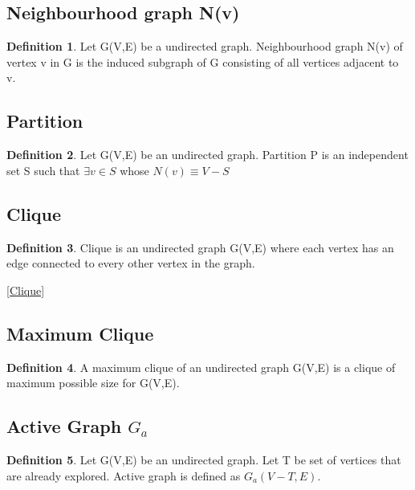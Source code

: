 \documentclass[12pt]{article}
\theoremstyle{plain}
\theoremstyle{definition}
\newtheorem{definition}{Definition}[section]
\begin{document}
\subsection{Neighbourhood graph N(v)}
\begin{definition} \label{NeighbourhoodGraph}
	Let G(V,E) be a undirected graph. Neighbourhood graph N(v) of vertex v in G is the induced subgraph of G consisting of all vertices adjacent to v.
\end{definition}



\subsection{Partition}
\begin{definition} \label{Partition}
	Let G(V,E) be an undirected graph. Partition P is an independent set S such that $\exists v \in S$
	 whose  $N(v) \equiv V - S$
\end{definition}


\subsection{Clique}
\begin{definition}
Clique is an undirected graph G(V,E) where each vertex has an edge connected to every other vertex in the graph.
\end{definition}

 \ref{Clique}

\subsection{Maximum Clique}
\begin{definition}
A maximum clique of an undirected graph G(V,E) is a clique of maximum possible size for G(V,E).
\end{definition}

\subsection{Active Graph $G_a$}
\begin{definition}
	Let G(V,E) be an undirected graph. Let T be set of vertices that are already explored. Active graph is defined as $G_a(V-T,E)$.
\end{definition}
\end{document}
